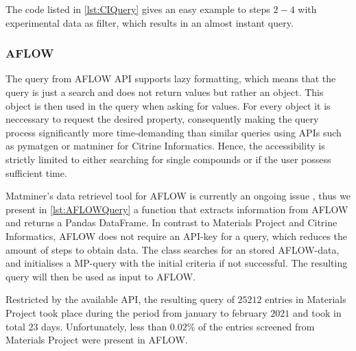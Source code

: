 The code listed in \autoref{lst:CIQuery} gives an easy example to steps $2-4$ with experimental data as filter, which results in an almost instant query.



\subsubsection{AFLOW}

The query from AFLOW API \cite{Curtarolo2012} supports lazy formatting, which means that the query is just a search and does not return values but rather an object. This object is then used in the query when asking for values. For every object it is neccessary to request the desired property, consequently making the query process significantly more time-demanding than similar queries using APIs such as pymatgen or matminer for Citrine Informatics. Hence, the accessibility is strictly limited to either searching for single compounds or if the user possess sufficient time.

Matminer's data retrievel tool for AFLOW is currently an ongoing issue \cite{Rosenbrock2017}, thus we present in \autoref{lst:AFLOWQuery} a function that extracts information from AFLOW and returns a Pandas DataFrame. In contrast to Materials Project and Citrine Informatics, AFLOW does not require an API-key for a query, which reduces the amount of steps to obtain data. The class searches for an stored AFLOW-data, and initialises a MP-query with the initial criteria if not successful. The resulting query will then be used as input to AFLOW.



Restricted by the available API, the resulting query of $25212$ entries in Materials Project took place during the period from january to february $2021$ and took in total $23$ days. Unfortunately, less than $0.02$\% of the entries screened from Materials Project were present in AFLOW.

